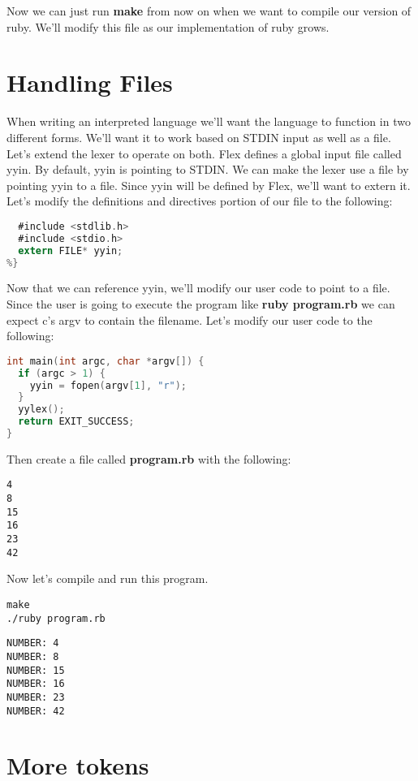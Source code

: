 Now we can just run {\bf make} from now on when we want to compile our version of ruby. We'll modify this file as our implementation of ruby grows.

\section{Handling Files}

When writing an interpreted language we'll want the language to function in two different forms. We'll want it to work based on STDIN input as well as a file. Let's extend the lexer to operate on both. Flex defines a global input file called yyin. By default, yyin is pointing to STDIN. We can make the lexer use a file by pointing yyin to a file. Since yyin will be defined by Flex, we'll want to extern it. Let's modify the definitions and directives portion of our file to the following:

\begin{lstlisting}[language=C]
%{
  #include <stdlib.h>
  #include <stdio.h>
  extern FILE* yyin;
%}
\end{lstlisting}

Now that we can reference yyin, we'll modify our user code to point to a file. Since the user is going to execute the program like {\bf ruby program.rb} we can expect c's argv to contain the filename. Let's modify our user code to the following:

\begin{lstlisting}[language=C]
int main(int argc, char *argv[]) {
  if (argc > 1) {
    yyin = fopen(argv[1], "r");
  }
  yylex();
  return EXIT_SUCCESS;
}
\end{lstlisting}

Then create a file called {\bf program.rb} with the following:

\begin{lstlisting}
4
8
15
16
23
42
\end{lstlisting}

Now let's compile and run this program.

\begin{lstlisting}
make
./ruby program.rb 
\end{lstlisting}

\begin{lstlisting}
NUMBER: 4
NUMBER: 8
NUMBER: 15
NUMBER: 16
NUMBER: 23
NUMBER: 42
\end{lstlisting}

\section{More tokens}

